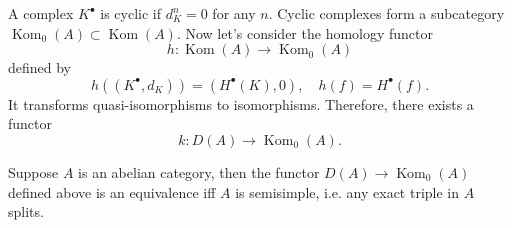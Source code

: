 \begin{para}
	A complex $K^\bullet$ is cyclic if $d_K^n=0$ for any $n$. 
	Cyclic complexes form a subcategory $\operatorname{Kom}_0(A)
	\subset \operatorname{Kom}(A)$. Now let's consider the 
	homology functor
	\[
		h:\operatorname{Kom}(A)\to \operatorname{Kom}_0(A)
	\]
	defined by 
	\[
		h((K^\bullet,d_K))=(H^\bullet(K),0),\quad 
		h(f)=H^\bullet(f).
	\]
	It transforms quasi-isomorphisms to isomorphisms. Therefore,
	there exists a functor 
	\[
		k:D(A)\to \operatorname{Kom}_0(A).
	\]
\end{para}

\begin{pro}
	Suppose $A$ is an abelian category, then 
	the functor $D(A)\to \operatorname{Kom}_0(A)$ defined above is 
	an equivalence iff $A$ is semisimple, i.e. any exact triple 
	in $A$ splits.
\end{pro}
